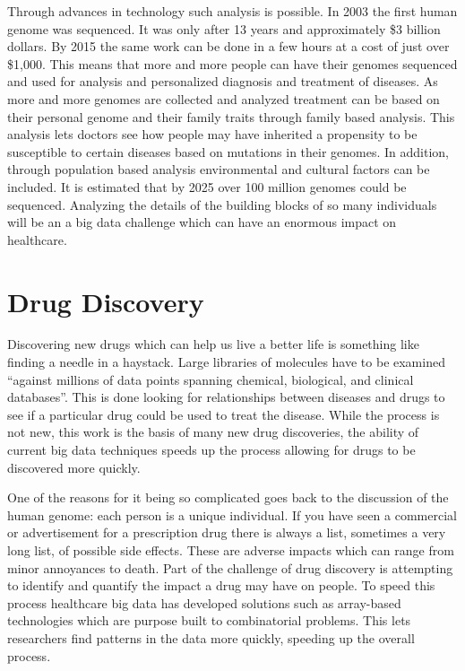 \documentclass[sigconf]{acmart}
\begin{document}
Through advances in technology such analysis is possible.  In 2003 
the first human genome was sequenced.  It was only after 13 years 
and approximately \$3 billion dollars.  By 2015 the same work can 
be done in a few hours at a cost of just over 
\$1,000\cite{HITAnalyticsGenomics}.  This means that more and more 
people can have their genomes sequenced and used for analysis and 
personalized diagnosis and treatment of diseases.  As more and 
more genomes are collected and analyzed treatment can be based on 
their personal genome and their family traits through family 
based analysis.  This analysis lets doctors see how people may 
have inherited a propensity to be susceptible to certain diseases 
based on mutations in their genomes.  In addition, through 
population based analysis environmental and cultural factors can 
be included.  It is estimated that by 2025 over 100 million genomes 
could be sequenced\cite{PMC5343946}.  Analyzing the details of 
the building blocks of so many individuals will be an a big data 
challenge which can have an enormous impact on healthcare.

\section{Drug Discovery}
Discovering new drugs which can help us live a better life is 
something like finding a needle in a haystack.  Large libraries 
of molecules have to be examined ``against millions of data points 
spanning chemical, biological, and clinical 
databases''\cite{MITSloan}.  This is done looking for relationships 
between diseases and drugs to see if a particular drug could be 
used to treat the disease.  While the process is not new, this work 
is the basis of many new drug discoveries, the ability of current 
big data techniques speeds up the process allowing for drugs to be 
discovered more quickly\cite{MITSloan}.

One of the reasons for it being so complicated goes back to the 
discussion of the human genome:  each person is a unique individual.  
If you have seen a commercial or advertisement for a prescription 
drug there is always a list, sometimes a very long list, of possible 
side effects.  These are adverse impacts which can range from minor 
annoyances to death.  Part of the challenge of drug discovery is 
attempting to identify and quantify the impact a drug may have on 
people.  To speed this process healthcare big data has developed 
solutions such as array-based technologies which are purpose built 
to combinatorial problems.  This lets researchers find patterns in 
the data more quickly, speeding up the overall 
process\cite{ClinicalLeader}.
\end{document}
